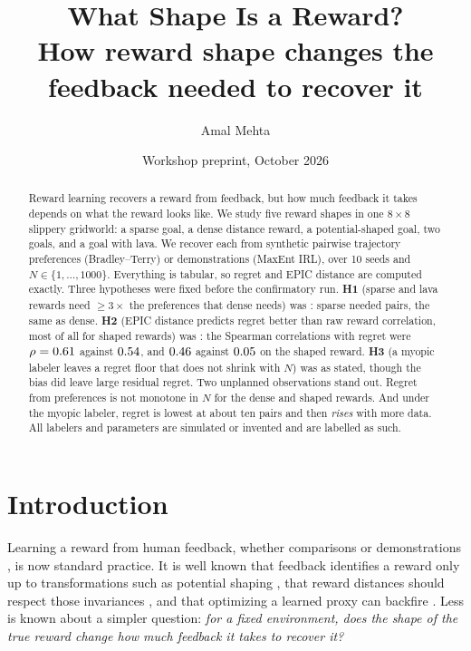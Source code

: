 \documentclass[10pt]{article}
\title{What Shape Is a Reward?\\\large How reward shape changes the feedback needed to recover it}
\author{Amal Mehta}
\date{Workshop preprint, October 2026}
\begin{document}
\maketitle

\begin{abstract}
Reward learning recovers a reward from feedback, but how much feedback it takes depends on what the reward looks like.
We study five reward shapes in one $8\times8$ slippery gridworld: a sparse goal, a dense distance reward, a potential-shaped
goal, two goals, and a goal with lava. We recover each from synthetic pairwise trajectory preferences (Bradley--Terry) or
demonstrations (MaxEnt IRL), over 10 seeds and $N\in\{1,\dots,1000\}$. Everything is tabular, so regret and EPIC distance are computed exactly.
Three hypotheses were fixed before the confirmatory run. \textbf{H1} (sparse and lava rewards need $\ge3\times$ the preferences
that dense needs) was \Hone: sparse needed \nstarprefssparse{} pairs, the same as dense. \textbf{H2} (EPIC distance predicts
regret better than raw reward correlation, most of all for shaped rewards) was \Htwo: the Spearman correlations with regret were
$\rho=0.61$ against $0.54$, and $0.46$ against $0.05$ on the shaped reward.
\textbf{H3} (a myopic labeler leaves a regret floor that does not shrink with $N$) was \Hthree{} as stated, though the bias did leave
large residual regret. Two unplanned observations stand out. Regret from preferences is not monotone in $N$ for the dense and shaped rewards.
And under the myopic labeler, regret is lowest at about ten pairs and then \emph{rises} with more data. All labelers and parameters are simulated or invented and are labelled as such.
\end{abstract}


\section{Introduction}
Learning a reward from human feedback, whether comparisons \citep{christiano2017deep,bradley1952rank} or demonstrations \citep{ziebart2008maxent},
is now standard practice. It is well known that feedback identifies a reward only up to transformations such as potential shaping
\citep{ng1999shaping,skalse2023invariance}, that reward distances should respect those invariances \citep{gleave2021epic,wulfe2022dard},
and that optimizing a learned proxy can backfire \citep{gao2022scaling}. Less is known about a simpler question:
\emph{for a fixed environment, does the shape of the true reward change how much feedback it takes to recover it?}
\end{document}
